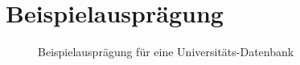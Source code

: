\newpage
\thispagestyle{plain}
\section*{Beispielausprägung}
  \begin{figure}[h!]
    
    \caption{Beispielausprägung für eine Universitäts-Datenbank}
  \label{BspAuspraegung}
  \end{figure}
  \clearpage